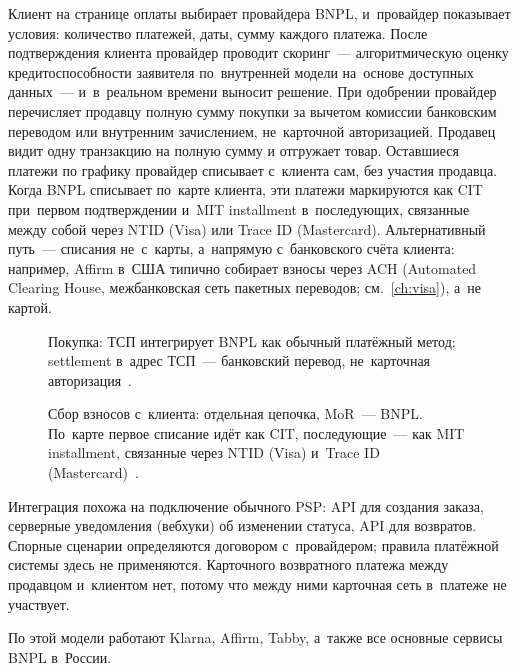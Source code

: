 Клиент на странице оплаты выбирает провайдера BNPL, и~провайдер
показывает условия: количество платежей, даты, сумму каждого платежа.
После подтверждения клиента провайдер проводит скоринг~--- алгоритмическую
оценку кредитоспособности заявителя по~внутренней модели на~основе
доступных данных~--- и~в~реальном времени выносит решение. При одобрении провайдер перечисляет продавцу
полную сумму покупки за вычетом комиссии банковским переводом или
внутренним зачислением, не~карточной авторизацией. Продавец видит одну
транзакцию на полную сумму и отгружает товар. Оставшиеся платежи
по графику провайдер списывает с~клиента сам, без участия продавца.
Когда BNPL списывает по~карте клиента, эти платежи маркируются как
CIT при~первом подтверждении и~MIT installment в~последующих,
связанные между собой через NTID (Visa) или Trace ID (Mastercard).
Альтернативный путь~--- списания не~с~карты, а~напрямую с~банковского
счёта клиента: например, Affirm в~США типично собирает взносы через
ACH (Automated Clearing House, межбанковская сеть пакетных переводов;
см.~\autoref{ch:visa}), а~не картой.

\begin{figure}[tbp]
  \centering
  \caption{Покупка: ТСП интегрирует BNPL как обычный платёжный метод;
  settlement в~адрес ТСП~--- банковский перевод, не~карточная
  авторизация~\cite{klarna-settlement-reports,tbank-dolyame-api}.}\label{fig:bnpl-psp-purchase}
\end{figure}

\begin{figure}[tbp]
  \centering
  \caption{Сбор взносов с~клиента: отдельная цепочка, MoR~--- BNPL.
  По~карте первое списание идёт как CIT, последующие~--- как MIT
  installment, связанные через NTID (Visa) и~Trace ID
  (Mastercard)~\cite{mrc-nti-trace-id}.}\label{fig:bnpl-psp-installments}
\end{figure}

Интеграция похожа на подключение обычного PSP: API
для создания заказа, серверные уведомления (вебхуки) об изменении
статуса, API для возвратов. Спорные сценарии определяются договором
с~провайдером; правила платёжной системы здесь не применяются. Карточного
возвратного платежа между продавцом и~клиентом нет, потому что между
ними карточная сеть в~платеже не участвует.

По этой модели работают Klarna, Affirm, Tabby, а~также все
основные сервисы BNPL в~России.

